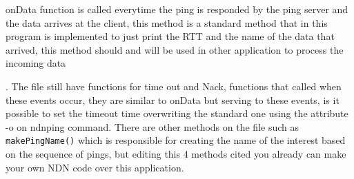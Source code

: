 \documentclass[11pt,conference]{./IEEEtran}
\begin{document}
\clearpage
onData function is called everytime the ping is responded by the ping server and the data arrives at the client, this method is a standard method that in this program is implemented to just print the RTT and the name of the data that arrived, this method should and will be used in other application to process the incoming data \par.
The file still have functions for time out and Nack, functions that called when these events occur, they are similar to onData but serving to these events, is it possible to set the timeout time overwriting the standard one using the attribute -o on ndnping command. There are other methods on the file such as \texttt{makePingName()} which is responsible for creating the name of the interest based on the sequence of pings, but editing this 4 methods cited you already can make your own NDN code over this application.



\end{document}
